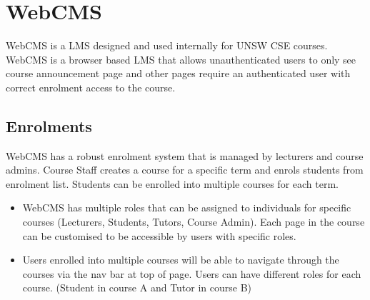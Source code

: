 \chapter{WebCMS}\label{ch:style}

WebCMS is a LMS designed and used internally for UNSW CSE courses. WebCMS is a browser based LMS that allows unauthenticated users to only see course announcement page and other pages require an authenticated user with correct enrolment access to the course.

\section{Enrolments}
WebCMS has a robust enrolment system that is managed by lecturers and course admins. Course Staff creates a course for a specific term and enrols students from enrolment list. Students can be enrolled into multiple courses for each term.
\begin{itemize}
\item WebCMS has multiple roles that can be assigned to individuals for specific courses (Lecturers, Students, Tutors, Course Admin). Each page in the course can be customised to be accessible by users with specific roles.
\item Users enrolled into multiple courses will be able to navigate through the courses via the nav bar at top of page. Users can have different roles for each course. (Student in course A and Tutor in course B)
\end{itemize}


